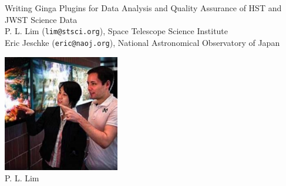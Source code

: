 \documentclass[]{article}
\begin{document}
\begin{minipage}[t]{0.8\linewidth}
  \vspace{0pt}
\begin{center}
{\huge Writing Ginga Plugins for Data Analysis and Quality Assurance of
            HST and JWST Science Data }\\

\vspace*{1.5em}
P. L. Lim ({\tt lim@stsci.org}),
Space Telescope Science Institute \\
Eric Jeschke ({\tt eric@naoj.org}),
National Astronomical Observatory of Japan
\end{center}
\end{minipage}
\hfill
\begin{minipage}[t]{0.15\linewidth}
  \vspace{0pt}
  \includegraphics[width=2in]{pllim} \\
  {P. L. Lim}
\end{minipage}
\vspace*{2em}
\hline

\raggedcolumns
\setlength{\columnseprule}{1pt}
\setlength{\columnsep}{2em}
\end{document}

